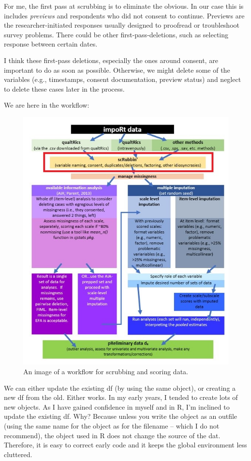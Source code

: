 \documentclass[
  english,
]{book}
\begin{document}
For me, the first pass at scrubbing is to eliminate the obvious. In our case this is includes \emph{previews} and respondents who did not consent to continue. Previews are the researcher-initiated responses usually designed to proofread or troubleshoot survey problems. There could be other first-pass-deletions, such as selecting response between certain dates.

I think these first-pass deletions, especially the ones around consent, are important to do as soon as possible. Otherwise, we might delete some of the variables (e.g., timestamps, consent documentation, preview status) and neglect to delete these cases later in the process.

We are here in the workflow:

\begin{figure}
\centering
\includegraphics{images/Ch02/wrkflow_prelim.jpg}
\caption{An image of a workflow for scrubbing and scoring data.}
\end{figure}

We can either update the existing df (by using the same object), or creating a new df from the old. Either works. In my early years, I tended to create lots of new objects. As I have gained confidence in myself and in R, I'm inclined to update the existing df. Why? Because unless you write the object as an outfile (using the same name for the object as for the filename -- which I do not recommend), the object used in R does not change the source of the dat. Therefore, it is easy to correct early code and it keeps the global environment less cluttered.
\end{document}
